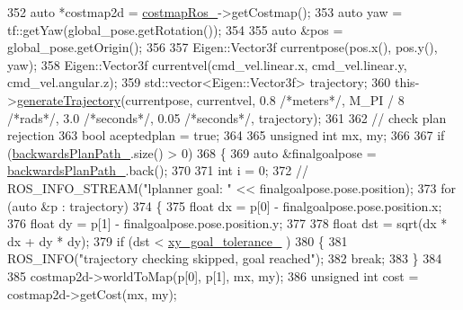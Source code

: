 \begin{DoxyCode}
{352     \textcolor{keyword}{auto} *costmap2d = \hyperlink{classmove__base__z__client_1_1backward__local__planner_1_1BackwardLocalPlanner_a865618f84238fe6ff437d1e38ec5fec0}{costmapRos\_}->getCostmap();
353     \textcolor{keyword}{auto} yaw = tf::getYaw(global\_pose.getRotation());
354 
355     \textcolor{keyword}{auto} &pos = global\_pose.getOrigin();
356 
357     Eigen::Vector3f currentpose(pos.x(), pos.y(), yaw);
358     Eigen::Vector3f currentvel(cmd\_vel.linear.x, cmd\_vel.linear.y, cmd\_vel.angular.z);
359     std::vector<Eigen::Vector3f> trajectory;
360     this->\hyperlink{classmove__base__z__client_1_1backward__local__planner_1_1BackwardLocalPlanner_a5da53f29e43639a9af5ba3b640e6bf8c}{generateTrajectory}(currentpose, currentvel, 0.8 \textcolor{comment}{/*meters*/}, M\_PI / 8 \textcolor{comment}{/*rads*/}, 
      3.0 \textcolor{comment}{/*seconds*/}, 0.05 \textcolor{comment}{/*seconds*/}, trajectory);
361 
362     \textcolor{comment}{// check plan rejection}
363     \textcolor{keywordtype}{bool} aceptedplan = \textcolor{keyword}{true};
364 
365     \textcolor{keywordtype}{unsigned} \textcolor{keywordtype}{int} mx, my;
366     
367     \textcolor{keywordflow}{if} (\hyperlink{classmove__base__z__client_1_1backward__local__planner_1_1BackwardLocalPlanner_a451add2af7d6d83a7415277311b3ed04}{backwardsPlanPath\_}.size() > 0)
368     \{
369         \textcolor{keyword}{auto} &finalgoalpose = \hyperlink{classmove__base__z__client_1_1backward__local__planner_1_1BackwardLocalPlanner_a451add2af7d6d83a7415277311b3ed04}{backwardsPlanPath\_}.back();
370         
371         \textcolor{keywordtype}{int} i = 0;
372         \textcolor{comment}{// ROS\_INFO\_STREAM("lplanner goal: " << finalgoalpose.pose.position);}
373         \textcolor{keywordflow}{for} (\textcolor{keyword}{auto} &p : trajectory)
374         \{
375             \textcolor{keywordtype}{float} dx = p[0] - finalgoalpose.pose.position.x;
376             \textcolor{keywordtype}{float} dy = p[1] - finalgoalpose.pose.position.y;
377 
378             \textcolor{keywordtype}{float} dst = sqrt(dx * dx + dy * dy);
379             \textcolor{keywordflow}{if} (dst < \hyperlink{classmove__base__z__client_1_1backward__local__planner_1_1BackwardLocalPlanner_a89ab1ee7283a474dc19970789f51c087}{xy\_goal\_tolerance\_} )
380             \{
381                 ROS\_INFO(\textcolor{stringliteral}{"trajectory checking skipped, goal reached"});
382                 \textcolor{keywordflow}{break};
383             \}
384 
385             costmap2d->worldToMap(p[0], p[1], mx, my);
386             \textcolor{keywordtype}{unsigned} \textcolor{keywordtype}{int} cost = costmap2d->getCost(mx, my);
}
\end{DoxyCode}
